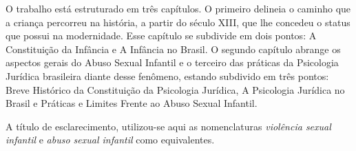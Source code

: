 O trabalho está estruturado em três capítulos. O primeiro delineia o caminho que a criança percorreu na história, a partir do século XIII, que lhe concedeu o status que possui na modernidade. Esse capítulo se subdivide em dois pontos: A Constituição da Infância e A Infância no Brasil. O segundo capítulo abrange os aspectos gerais do Abuso Sexual Infantil e o terceiro das práticas da Psicologia Jurídica brasileira diante desse fenômeno, estando subdivido em três pontos: Breve Histórico da Constituição da Psicologia Jurídica, A Psicologia Jurídica no Brasil e Práticas e Limites Frente ao Abuso Sexual Infantil.

A título de esclarecimento, utilizou-se aqui as nomenclaturas \emph{violência sexual infantil} e \emph{abuso sexual infantil} como equivalentes. 
